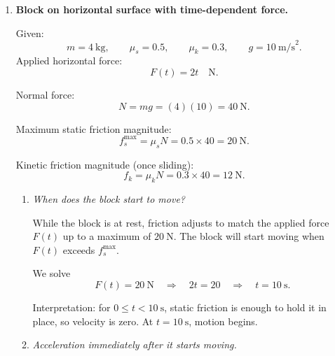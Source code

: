 \documentclass[12pt]{article}
\begin{document}
\begin{enumerate}
So
\[
m_3 \mathbf{v}_3
= - (12\,\hat{\imath} + 12\,\hat{\jmath})
= (-12)\,\hat{\imath} + (-12)\,\hat{\jmath}.
\]

Since $m_3=6~\text{kg}$,
\[
\mathbf{v}_3
= \frac{1}{6}(-12\,\hat{\imath} - 12\,\hat{\jmath})
= (-2)\,\hat{\imath} + (-2)\,\hat{\jmath}
\quad \text{m/s}.
\]

So the third fragment moves with velocity
\[
\mathbf{v}_3 = (-2, -2)~\text{m/s}.
\]

Speed:
\[
v_3 = \sqrt{(-2)^2 + (-2)^2}
= \sqrt{4+4}
= \sqrt{8}
= 2\sqrt{2} \approx 2.83~\text{m/s}.
\]

Direction: both components are negative, so it moves toward the southwest, at $45^\circ$ below the $-x$ axis (i.e. equally south and west).

We can express the direction angle $\theta$ measured from due west toward south:
\[
\tan \theta = \frac{2}{2} = 1
\quad\Rightarrow\quad
\theta = 45^\circ.
\]

Thus $m_3$ moves to the southwest at $2\sqrt{2}~\text{m/s}$.


\item \textbf{Block on horizontal surface with time-dependent force.}

Given:
\[
m = 4~\text{kg}, \qquad
\mu_s = 0.5, \qquad
\mu_k = 0.3, \qquad
g=10~\text{m/s}^2.
\]
Applied horizontal force:
\[
F(t) = 2t \quad \text{N}.
\]

Normal force:
\[
N = mg = (4)(10) = 40~\text{N}.
\]

Maximum static friction magnitude:
\[
f_s^{\max} = \mu_s N = 0.5 \times 40 = 20~\text{N}.
\]

Kinetic friction magnitude (once sliding):
\[
f_k = \mu_k N = 0.3 \times 40 = 12~\text{N}.
\]

\begin{enumerate}
    \item \textit{When does the block start to move?}

    While the block is at rest, friction adjusts to match the applied force $F(t)$ up to a maximum of $20~\text{N}$. The block will start moving when $F(t)$ exceeds $f_s^{\max}$.

    We solve
    \[
    F(t) = 20~\text{N}
    \quad\Rightarrow\quad
    2t = 20
    \quad\Rightarrow\quad
    t = 10~\text{s}.
    \]

    Interpretation: for $0 \le t < 10~\text{s}$, static friction is enough to hold it in place, so velocity is zero. At $t=10~\text{s}$, motion begins.

    \item \textit{Acceleration immediately after it starts moving.}


\end{enumerate}
\end{enumerate}
\end{document}
